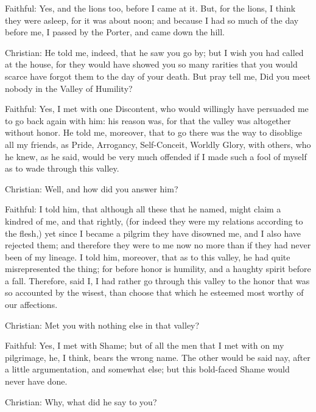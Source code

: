 Faithful: Yes, and the lions too, before I came at it. But, for the lions, I think they were asleep, for it was about noon; and because I had so much of the day before me, I passed by the Porter, and came down the hill.

Christian: He told me, indeed, that he saw you go by; but I wish you had called at the house, for they would have showed you so many rarities that you would scarce have forgot them to the day of your death. But pray tell me, Did you meet nobody in the Valley of Humility?

Faithful: Yes, I met with one Discontent, who would willingly have persuaded me to go back again with him: his reason was, for that the valley was altogether without honor. He told me, moreover, that to go there was the way to disoblige all my friends, as Pride, Arrogancy, Self-Conceit, Worldly Glory, with others, who he knew, as he said, would be very much offended if I made such a fool of myself as to wade through this valley.

Christian: Well, and how did you answer him?

Faithful: I told him, that although all these that he named, might claim a kindred of me, and that rightly, (for indeed they were my relations according to the flesh,) yet since I became a pilgrim they have disowned me, and I also have rejected them; and therefore they were to me now no more than if they had never been of my lineage. I told him, moreover, that as to this valley, he had quite misrepresented the thing; for before honor is humility, and a haughty spirit before a fall. Therefore, said I, I had rather go through this valley to the honor that was so accounted by the wisest, than choose that which he esteemed most worthy of our affections.

Christian: Met you with nothing else in that valley?

Faithful: Yes, I met with Shame; but of all the men that I met with on my pilgrimage, he, I think, bears the wrong name. The other would be said nay, after a little argumentation, and somewhat else; but this bold-faced Shame would never have done.

Christian: Why, what did he say to you?

